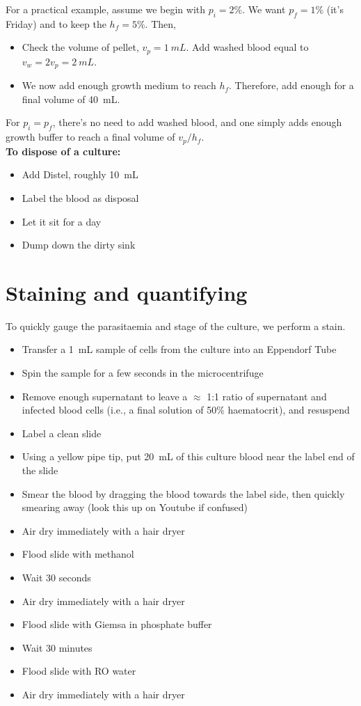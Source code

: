\documentclass{article}
\begin{document}
For a practical example, assume we begin with $p_i = 2\%$. We want $p_f = 1\%$ (it's Friday) and to keep the $h_f = 5\%$. Then,

\begin{itemize}
	\item Check the volume of pellet, $v_p = \SI{1}{mL}$. Add washed blood equal to $v_w = 2 v_p = \SI{2}{mL}$. 
	\item We now add enough growth medium to reach $h_f$. Therefore, add enough for a final volume of \SI{40}{mL}.
\end{itemize}

For $p_i = p_f$, there's no need to add washed blood, and one simply adds enough growth buffer to reach a final volume of $v_p/h_f$.\\

\textbf{To dispose of a culture:}

\begin{itemize}
	\item Add Distel, roughly \SI{10}{mL}
	\item Label the blood as disposal
	\item Let it sit for a day
	\item Dump down the dirty sink
\end{itemize}

\newpage
\section{Staining and quantifying}

To quickly gauge the parasitaemia and stage of the culture, we perform a stain.

\begin{itemize}
	\item Transfer a \SI{1}{mL} sample of cells from the culture into an Eppendorf Tube
	\item Spin the sample for a few seconds in the microcentrifuge
	\item Remove enough supernatant to leave a $\approx$ 1:1 ratio of supernatant and infected blood cells (i.e., a final solution of 50\% haematocrit), and resuspend
	\item Label a clean slide
	\item Using a yellow pipe tip, put \SI{20}{mL} of this culture blood near the label end of the slide
	\item Smear the blood by dragging the blood towards the label side, then quickly smearing away (look this up on Youtube if confused)
	\item Air dry immediately with a hair dryer
	\item Flood slide with methanol
	\item Wait 30 seconds
	\item Air dry immediately with a hair dryer
	\item Flood slide with Giemsa in phosphate buffer
	\item Wait 30 minutes
	\item Flood slide with RO water
	\item Air dry immediately with a hair dryer
\end{itemize}
\end{document}
